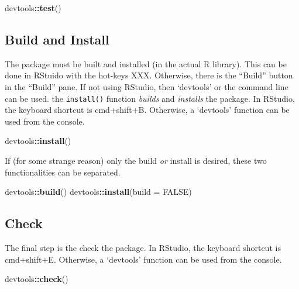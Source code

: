 \documentclass[]{book}
\newenvironment{Shaded}{\begin{snugshade}}{\end{snugshade}}
\newcommand{\DataTypeTok}[1]{\textcolor[rgb]{0.13,0.29,0.53}{#1}}
\newcommand{\KeywordTok}[1]{\textcolor[rgb]{0.13,0.29,0.53}{\textbf{#1}}}
\newcommand{\NormalTok}[1]{#1}
\newcommand{\OperatorTok}[1]{\textcolor[rgb]{0.81,0.36,0.00}{\textbf{#1}}}
\newcommand{\OtherTok}[1]{\textcolor[rgb]{0.56,0.35,0.01}{#1}}
\begin{document}
\begin{Shaded}
\begin{Highlighting}[]
\NormalTok{devtools}\OperatorTok{::}\KeywordTok{test}\NormalTok{()}
\end{Highlighting}
\end{Shaded}

\hypertarget{build-and-install}{%
\subsection{Build and Install}\label{build-and-install}}

The package must be built and installed (in the actual R library). This can be done in RStuido with the hot-keys XXX. Otherwise, there is the ``Build'' button in the ``Build'' pane. If not using RStudio, then `devtools' or the command line can be used. the \texttt{install()} function \emph{builds} and \emph{installs} the package. In RStudio, the keyboard shortcut is cmd+shift+B. Otherwise, a `devtools' function can be used from the console.

\begin{Shaded}
\begin{Highlighting}[]
\NormalTok{devtools}\OperatorTok{::}\KeywordTok{install}\NormalTok{()}
\end{Highlighting}
\end{Shaded}

If (for some strange reason) only the build \emph{or} install is desired, these two functionalities can be separated.

\begin{Shaded}
\begin{Highlighting}[]
\NormalTok{devtools}\OperatorTok{::}\KeywordTok{build}\NormalTok{()}
\NormalTok{devtools}\OperatorTok{::}\KeywordTok{install}\NormalTok{(}\DataTypeTok{build =} \OtherTok{FALSE}\NormalTok{)}
\end{Highlighting}
\end{Shaded}

\hypertarget{check}{%
\subsection{Check}\label{check}}

The final step is the check the package. In RStudio, the keyboard shortcut is cmd+shift+E. Otherwise, a `devtools' function can be used from the console.

\begin{Shaded}
\begin{Highlighting}[]
\NormalTok{devtools}\OperatorTok{::}\KeywordTok{check}\NormalTok{()}
\end{Highlighting}
\end{Shaded}
\end{document}
